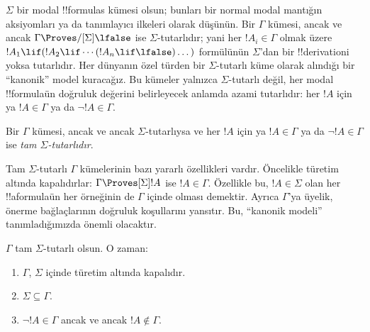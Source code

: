 \documentclass[../../../include/open-logic-section]{subfiles}
\begin{document}


$\Sigma$ bir modal !!{formula}s kümesi olsun; bunları bir normal modal
mantığın aksiyomları ya da tanımlayıcı ilkeleri olarak düşünün. Bir $\Gamma$
kümesi, ancak ve ancak $\Gamma\Proves/[\Sigma]\lfalse$ ise
$\Sigma$-tutarlıdır; yani her $!A_i\in\Gamma$ olmak üzere
$!A_1\lif(!A_2\lif\cdots(!A_n\lif\lfalse)\dots)$ formülünün $\Sigma$'dan
bir !!{derivation}{}i yoksa tutarlıdır. Her dünyanın özel türden bir
$\Sigma$-tutarlı küme olarak alındığı bir ``kanonik'' model kuracağız. Bu
kümeler yalnızca $\Sigma$-tutarlı değil, her modal !!{formula}{}ün doğruluk
değerini belirleyecek anlamda azami tutarlıdır: her $!A$ için ya
$!A\in\Gamma$ ya da $\lnot !A\in\Gamma$.

\begin{defn}
  Bir $\Gamma$ kümesi, ancak ve ancak $\Sigma$-tutarlıysa ve her $!A$ için
  ya $!A\in\Gamma$ ya da $\lnot !A\in\Gamma$ ise \emph{tam
  $\Sigma$-tutarlıdır}.
\end{defn}

Tam $\Sigma$-tutarlı $\Gamma$ kümelerinin bazı yararlı özellikleri vardır.
Öncelikle türetim altında kapalıdırlar: $\Gamma\Proves[\Sigma]!A$ ise
$!A\in\Gamma$. Özellikle bu, $!A\in\Sigma$ olan her !!a{formula}{}ün her
örneğinin de $\Gamma$ içinde olması demektir. Ayrıca $\Gamma$'ya üyelik,
önerme bağlaçlarının doğruluk koşullarını yansıtır. Bu, ``kanonik modeli''
tanımladığımızda önemli olacaktır.

\begin{prop}
  $\Gamma$ tam $\Sigma$-tutarlı olsun. O zaman:
  \begin{enumerate}
  \item {}%
    $\Gamma$, $\Sigma$ içinde türetim altında kapalıdır.
  \item {}%
    $\Sigma\subseteq\Gamma$.
  \item {}%
    $\lnot!A\in\Gamma$ ancak ve ancak $!A\notin\Gamma$.
  \end{enumerate}
\end{prop}
\end{document}
